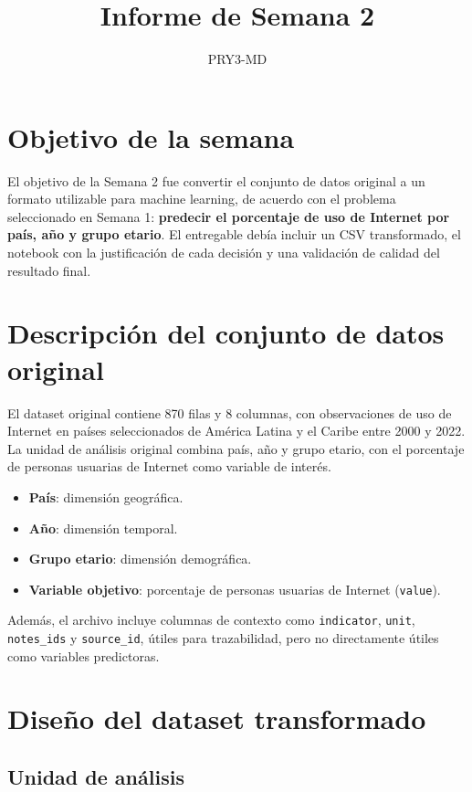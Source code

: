 \documentclass[12pt,a4paper]{article}
\title{Informe de Semana 2}
\author{PRY3-MD}
\date{}
\begin{document}
\maketitle

\section{Objetivo de la semana}

El objetivo de la Semana 2 fue convertir el conjunto de datos original a un formato utilizable para machine learning, de acuerdo con el problema seleccionado en Semana 1: \textbf{predecir el porcentaje de uso de Internet por país, año y grupo etario}. El entregable debía incluir un CSV transformado, el notebook con la justificación de cada decisión y una validación de calidad del resultado final.

\section{Descripción del conjunto de datos original}

El dataset original contiene 870 filas y 8 columnas, con observaciones de uso de Internet en países seleccionados de América Latina y el Caribe entre 2000 y 2022. La unidad de análisis original combina país, año y grupo etario, con el porcentaje de personas usuarias de Internet como variable de interés.

\begin{itemize}
    \item \textbf{País}: dimensión geográfica.
    \item \textbf{Año}: dimensión temporal.
    \item \textbf{Grupo etario}: dimensión demográfica.
    \item \textbf{Variable objetivo}: porcentaje de personas usuarias de Internet (\texttt{value}).
\end{itemize}

Además, el archivo incluye columnas de contexto como \texttt{indicator}, \texttt{unit}, \texttt{notes\_ids} y \texttt{source\_id}, útiles para trazabilidad, pero no directamente útiles como variables predictoras.

\section{Diseño del dataset transformado}

\subsection{Unidad de análisis}
\end{document}
